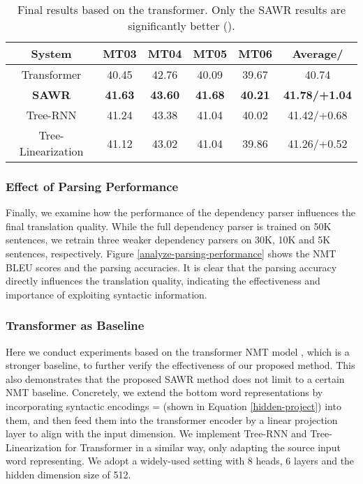 \documentclass[11pt,a4paper]{article}
\begin{document}
\begin{CJK}{UTF8}{gbsn}
\setlength{\tabcolsep}{6pt}
\begin{table*}[ht]
	\begin{center}
\begin{tabular}{c|cccc|c}
				\hline
                System & MT03  & MT04  & MT05  & MT06 & Average/ \\ \hline
				Transformer & 40.45  &   42.76  &  40.09  &  39.67   & 40.74  \\ \hline
                \bf SAWR & \bf 41.63 & \bf 43.60 & \bf 41.68 & \bf 40.21 & \bf 41.78/+1.04   \\ \hline \hline
				Tree-RNN & 41.24 & 43.38 & 41.04 & 40.02 & 41.42/+0.68    \\
                Tree-Linearization & 41.12 & 43.02 & 41.04 & 39.86 & 41.26/+0.52  \\ \hline
			\end{tabular}
			\caption{Final results based on the transformer. Only the SAWR results are significantly better ().}
			\label{table:transformer:result}
\end{center}
\end{table*}



\subsubsection{Effect of Parsing Performance}
Finally, we examine how the performance of the dependency parser influences the final translation quality.
While the full dependency parser is trained on 50K sentences,
we retrain three weaker dependency parsers on 30K, 10K and 5K sentences, respectively.
Figure \ref{analyze-parsing-performance} shows the NMT BLEU scores and the parsing accuracies.
It is clear that the parsing accuracy directly influences the translation quality, indicating the effectiveness and importance of exploiting syntactic  information.






\subsubsection{Transformer as Baseline}
Here we conduct experiments based on the transformer NMT model \cite{vaswani2017attention},
which is a stronger baseline, to further verify the effectiveness of our proposed method.
This also demonstrates that the proposed SAWR method does not limit to a certain NMT baseline.
Concretely, we extend the bottom word representations
by incorporating syntactic encodings = (shown
in Equation \ref{hidden-project}) into them,
and then feed them into the transformer encoder by a linear projection layer to align with the input dimension.
We implement Tree-RNN and Tree-Linearization for Transformer in a similar way,
only adapting the source input word representing.
We adopt a widely-used setting with 8 heads, 6 layers and the hidden dimension size of 512.


\end{CJK}
\end{document}
